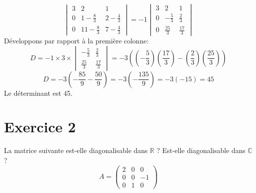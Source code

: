 \begin{solution}
\[\begin{vmatrix}
3 & 2 & 1 \\
0 & 1 - \frac{8}{3} & 2 - \frac{4}{3} \\
0 & 11 - \frac{8}{3} & 7 - \frac{4}{3}
\end{vmatrix} = -1 \begin{vmatrix}
3 & 2 & 1 \\
0 & -\frac{5}{3} & \frac{2}{3} \\
0 & \frac{25}{3} & \frac{17}{3}
\end{vmatrix}
\]
Développons par rapport à la première colonne:
\[
D = -1 \times 3 \times \begin{vmatrix}
-\frac{5}{3} & \frac{2}{3} \\
\frac{25}{3} & \frac{17}{3}
\end{vmatrix} = -3 \left( (-\frac{5}{3})(\frac{17}{3}) - (\frac{2}{3})(\frac{25}{3}) \right)
\]
\[
D = -3 \left( -\frac{85}{9} - \frac{50}{9} \right) = -3 \left( -\frac{135}{9} \right) = -3 (-15) = 45
\]
Le déterminant est 45.
\end{solution}

\section{Exercice 2}
La matrice suivante est-elle diagonalisable dans $\mathbb{R}$ ? Est-elle diagonalisable dans $\mathbb{C}$ ?
\[ A = \begin{pmatrix} 2 & 0 & 0 \\ 0 & 0 & -1 \\ 0 & 1 & 0 \end{pmatrix} \]

